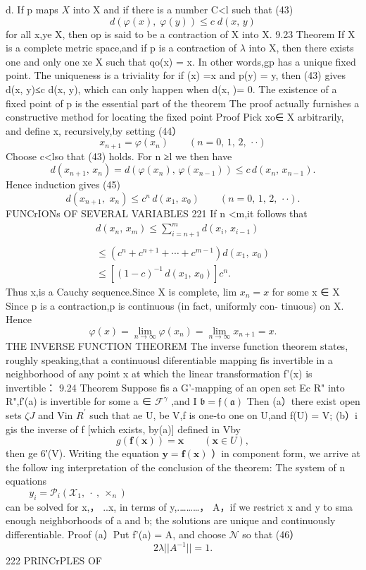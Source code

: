 d. If p maps $X$ into X and if there is a number C<l such that (43) $$ d(\varphi(x),\;\varphi(y))\leq c\;d(x,\,y) $$ for all x,ye X, then op is said to be a contraction of X into X. 9.23 Theorem If X is a complete metric space,and if p is a contraction of $\lambda$ into X, then there exists one and only one xe X such that qo(x) = x. In other words,gp has a unique fixed point. The uniqueness is a triviality for if (x) =x and p(y) = y, then (43) gives d(x, y)≤c d(x, y), which can only happen when d(x, )= 0. The existence of a fixed point of p is the essential part of the theorem The proof actually furnishes a constructive method for locating the fixed point Proof Pick xo∈ X arbitrarily, and define {x,} recursively,by setting (44） $$ x_{n+1}=\varphi(x_{n})\qquad(n=0,\,1,\,2,\,\cdot\cdot) $$ Choose c<lso that (43) holds. For n ≥l we then have $$ d(x_{n+1},\,x_{n})=d(\varphi(x_{n}),\,\varphi(x_{n-1}))\leq c\,d(x_{n},\,x_{n-1}). $$ Hence induction gives (45) $$ d(x_{n+1},\,\,x_{n})\leq c^{n}\,d(x_{1},\,x_{0})\qquad(n=0,\,1,\,2,\,\cdot\cdot). $$FUNCrIONs OF SEVERAL VARIABLES 221 If n <m,it follows that $$ \begin{array}{l}{{d(x_{n},\,x_{m})\leq\sum_{i={n+1}}^{m}d(x_{i},\,x_{i-1})}}\\ {{\,}}\\ {{\leq\left(c^{n}+c^{n+1}+\cdots+c^{m-1}\right)d(x_{1},\,x_{0})}}\\ {{\leq\left[(1-c)^{-1}\,d(x_{1},\,x_{0})\right]c^{n}.}}\end{array} $$ Thus {x,}is a Cauchy sequence.Since X is complete, lim $x_{n}=x$ for some x ∈ X Since p is a contraction,p is continuous (in fact, uniformly con- tinuous) on X. Hence $$ \varphi(x)=\operatorname*{lim}_{n\to\infty}\varphi(x_{n})=\operatorname*{lim}_{n\to\infty}x_{n+1}=x. $$ THE INVERSE FUNCTION THEOREM The inverse function theorem states, roughly speaking,that a continuousl diferentiable mapping fis invertible in a neighborhood of any point x at which the linear transformation f'(x) is invertible： 9.24 Theorem Suppose fis a G'-mapping of an open set Ec R" into R",f′(a) is invertible for some a ∈ ${\mathcal{F}}^{\gamma}$ ,and I ${\mathfrak{b}}={\mathfrak{f}}({\mathfrak{a}})$ Then (a）there exist open sets $\textstyle\zeta J$ and Vin $\textstyle{R^{\prime}}$ such that ae U, be V,f is one-to one on U,and f(U) = V; (b）i gis the inverse of f [which exists, by(a)] defined in Vby $$ g(\mathbf{f}(\mathbf{x}))=\mathbf{x}\qquad(\mathbf{x}\in U), $$ then ge 6′(V). Writing the equation $\mathbf{y}=\mathbf{f}(\mathbf{x})$ ）in component form, we arrive at the follow ing interpretation of the conclusion of the theorem: The system of n equations $$ y_{i}=\mathcal{P}_{i}(\mathcal{X}_{1},\ \cdot\ ,\ \times_{n})\,\,\,\,\,\,\,\,\,\,\,\,\,\,\,\,\,\,\,\,\,\,\,\,\,\,\,\,\,\,\,\,\,\,\,\,\,\,\,\,\,\,\,\,\,\,\,\,\,\,\,\,\,\,\,\,\,\,\,\,\,\,\,\,\,\,\,\,\,\,\,\,\,\,\,\,\,\,\,\,\,\,\,\,\,\,\,\,\,\,\,\,\,\,\,\,\,\,\,\,\,\,\,\,\,\,\,\,\,\,\,\,\,\,\,\,\,\,\,\,\,\,\,\,\,\,\,\, $$ can be solved for x,， ..x, in terms of y,.………， A，if we restrict x and y to sma enough neighborhoods of a and b; the solutions are unique and continuously differentiable. Proof (a）Put f'(a) = A, and choose ${\mathcal{N}}$ so that (46） $$ 2\lambda||A^{-1}||=1. $$222 PRINCrPLES OF 